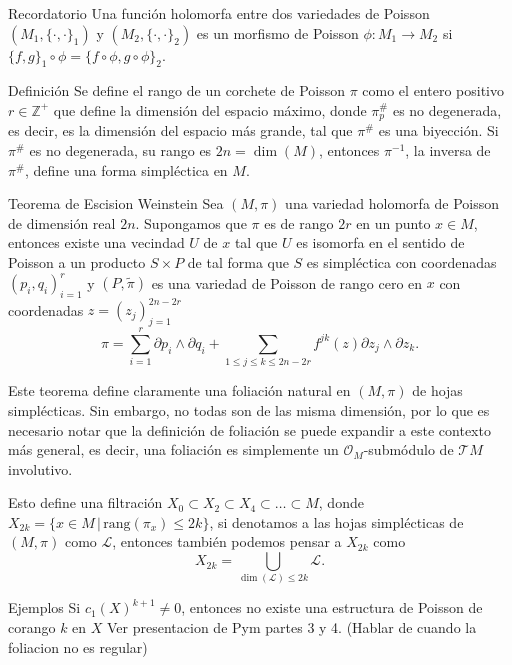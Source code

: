 \documentclass[letterpaper]{beamer}
\newcommand{\zah}{\ensuremath{ \mathbb Z }}
\begin{document}
\begin{frame}
    \begin{block}{Recordatorio}
        Una funci\'on holomorfa entre dos variedades de Poisson $(M_1,\{\cdot,\cdot\}_1)$ y $(M_2,\{\cdot,\cdot\}_2)$ es un morfismo de Poisson
        $\phi:M_1\rightarrow M_2$ si $\{f,g\}_1\circ\phi=\{f\circ\phi,g\circ\phi\}_2$.
    \end{block}
    \begin{block}{Definici\'on}
      Se define el rango de un corchete de Poisson $\pi$ como el entero positivo $r\in \zah^{+}$ que define la dimensi\'on del
      espacio m\'aximo, donde $\pi^{\#}_p$ es no degenerada, es decir, es la dimensi\'on del espacio m\'as grande, tal que $\pi^{\#}$ es una
      biyecci\'on. Si $\pi^{\#}$ es no degenerada, su rango es $2n=\dim(M)$, entonces $\pi^{-1}$, la inversa de $\pi^{\#}$, define una forma simpl\'ectica
      en $M$.
    \end{block}
\end{frame}

\begin{frame}
\begin{block}{Teorema de Escision Weinstein}\label{weins}
        Sea $(M,\pi)$ una variedad holomorfa de Poisson de dimensi\'on real $2n$. Supongamos que $\pi$ es de rango $2r$ en un punto $x\in M$,
        entonces existe una vecindad $U$ de $x$ tal que $U$ es isomorfa en el sentido de Poisson a un producto $S\times P$ de tal forma que $S$ es
        simpl\'ectica con coordenadas $(p_i,q_i)_{i=1}^r$ y $(P,\tilde{\pi})$ es una variedad de Poisson de rango cero en $x$
        con coordenadas $z=(z_j)_{j=1}^{2n-2r}$
        \[
                \pi=\sum_{i=1}^r \partial{p_i}\wedge\partial{q_i}+\sum_{1\leq j\leq k\leq 2n-2r} f^{jk}(z)\partial{z_j}\wedge\partial{z_k}.
        \]
      \end{block}
\end{frame}
\begin{frame}  Este teorema define claramente una foliaci\'on natural en $(M,\pi)$ de hojas
simpl\'ecticas. Sin embargo, no todas son de las misma dimensi\'on, por lo que es necesario notar que la definici\'on de foliaci\'on
se puede expandir a este contexto m\'as general, es decir, una foliaci\'on es simplemente un $\mathcal{O}_M$-subm\'odulo de $\mathcal{T}M$ involutivo.
\begin{block}{Esto define una filtraci\'on}
 $X_0\subset X_2\subset X_4\subset\dots\subset M$, donde $X_{2k}=\{x\in M\,|\,\textrm{rang}(\pi_x)\leq 2k\}$,
si denotamos a las hojas simpl\'ecticas de $(M,\pi)$ como $\mathcal{L}$, entonces tambi\'en podemos pensar a $X_{2k}$ como
$$
X_{2k}=\bigcup_{\dim(\mathcal{L})\leq 2k}\mathcal{L}.
$$
\end{block}
\end{frame}
\begin{frame}
  \begin{block}{Ejemplos}
    Si $c_{1}(X)^{k+1}\neq0$, entonces no existe una estructura de Poisson de corango $k$ en $X$
    Ver presentacion de Pym partes 3 y 4. (Hablar de cuando la foliacion no es regular)
  \end{block}
\end{frame}
\end{document}
